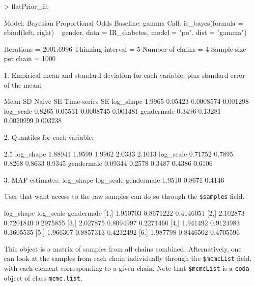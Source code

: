 \documentclass[a4paper]{article}
\begin{document}
\begin{Schunk}
\begin{Sinput}
> flatPrior_fit
\end{Sinput}
\begin{Soutput}
Model:  Bayesian Proportional Odds
Baseline:  gamma 
Call: ic_bayes(formula = cbind(left, right) ~ gender, data = IR_diabetes, 
    model = "po", dist = "gamma")


Iterations = 2001:6996
Thinning interval = 5 
Number of chains = 4 
Sample size per chain = 1000 

1. Empirical mean and standard deviation for each variable,
   plus standard error of the mean:

             Mean      SD  Naive SE Time-series SE
log_shape  1.9965 0.05423 0.0008574       0.001298
log_scale  0.8265 0.05531 0.0008745       0.001481
gendermale 0.3496 0.13281 0.0020999       0.003238

2. Quantiles for each variable:

              2.5%
log_shape  1.88941 1.9599 1.9962 2.0333 2.1013
log_scale  0.71752 0.7895 0.8268 0.8633 0.9345
gendermale 0.09344 0.2578 0.3487 0.4386 0.6106

3. MAP estimates:
 log_shape  log_scale gendermale 
    1.9510     0.8671     0.4146 
\end{Soutput}
\end{Schunk}

User that want access to the raw samples can do so through the \texttt{\$samples}
field. 

\begin{Schunk}
\begin{Soutput}
     log_shape log_scale gendermale
[1,]  1.950703 0.8671222  0.4146051
[2,]  2.102873 0.7201840  0.2975855
[3,]  2.027875 0.8094997  0.2271460
[4,]  1.941492 0.9124983  0.3605535
[5,]  1.966307 0.8857313  0.4232492
[6,]  1.987798 0.8446502  0.4705596
\end{Soutput}
\end{Schunk}

This object is a matrix of samples from all chains combined. Alternatively, 
one can look at the samples from each chain individually through the 
\texttt{\$mcmcList} field, with each element corresponding to a given chain. 
Note that \texttt{\$mcmcList} is a \texttt{coda} object of class \texttt{mcmc.list}.
\end{document}
